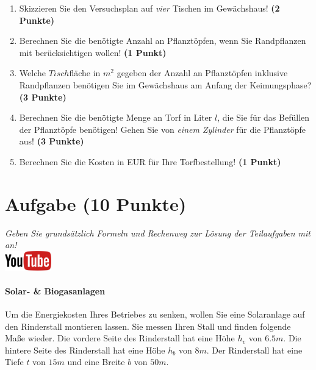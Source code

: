 \documentclass[a4paper, 9pt]{scrartcl}\usepackage[]{graphicx}\usepackage[]{xcolor}
\begin{document}
\begin{enumerate}
\item Skizzieren Sie den Versuchsplan auf \textit{vier} Tischen im
  Gew{\"a}chshaus! \textbf{(2 Punkte)}
\item Berechnen Sie die ben{\"o}tigte Anzahl an Pflanzt{\"o}pfen, wenn Sie
  Randpflanzen mit ber{\"u}cksichtigen wollen! \textbf{(1 Punkt)}
\item Welche $Tisch$fl{\"a}che in $m^2$ gegeben der Anzahl an
  Pflanzt{\"o}pfen inklusive Randpflanzen ben{\"o}tigen Sie im Gew{\"a}chshaus am
  Anfang der Keimungsphase?  \textbf{(3 Punkte)}
\item Berechnen Sie die ben{\"o}tigte Menge an Torf in Liter $l$, die Sie f{\"u}r
  das Bef{\"u}llen der Pflanzt{\"o}pfe ben{\"o}tigen! Gehen Sie von \textit{einem
    Zylinder} f{\"u}r die Pflanzt{\"o}pfe aus!  \textbf{(3 Punkte)}
\item Berechnen Sie die Kosten in EUR f{\"u}r Ihre Torfbestellung! \textbf{(1
    Punkt)}
\end{enumerate}



 
\clearpage

\section{Aufgabe \hfill (10 Punkte)}

\textit{Geben Sie grunds{\"a}tzlich Formeln und Rechenweg zur L{\"o}sung der
  Teilaufgaben mit an!} \\[1Ex]

\hfill\href{https://youtu.be/aBxLkdF-c4M}{\includegraphics[width =
  2cm]{img/youtube}} %
\hspace{2Ex}

\paragraph{Solar- \& Biogasanlagen}



Um die Energiekosten Ihres Betriebes zu senken, wollen Sie eine Solaranlage
auf den Rinderstall montieren lassen. Sie messen Ihren Stall und finden
folgende Ma{\ss}e wieder. Die vordere Seite des Rinderstall hat eine H{\"o}he
$h_v$ von $6.5m$. Die hintere Seite des Rinderstall hat eine
H{\"o}he $h_b$ von $8m$. Der Rinderstall hat eine Tiefe $t$ von
$15m$ und eine Breite $b$ von $50m$.
\end{document}
